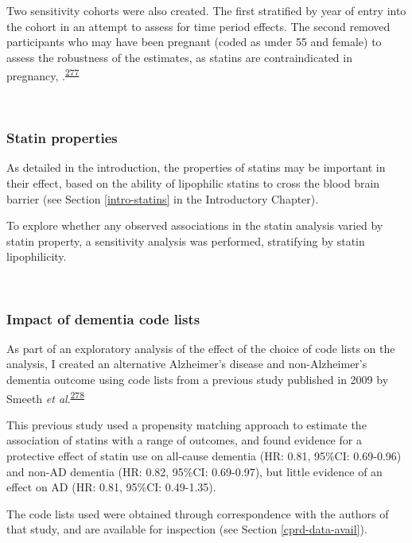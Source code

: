 \documentclass[a4paper, twoside]{templates/ociamthesis}
\begin{document}
Two sensitivity cohorts were also created. The first stratified by year of entry into the cohort in an attempt to assess for time period effects. The second removed participants who may have been pregnant (coded as under 55 and female) to assess the robustness of the estimates, as statins are contraindicated in pregnancy, .\textsuperscript{\protect\hyperlink{ref-karalis2016}{277}}

~

\hypertarget{statin-properties}{%
\subsubsection{Statin properties}\label{statin-properties}}

As detailed in the introduction, the properties of statins may be important in their effect, based on the ability of lipophilic statins to cross the blood brain barrier (see Section \ref{intro-statins} in the Introductory Chapter).

To explore whether any observed associations in the statin analysis varied by statin property, a sensitivity analysis was performed, stratifying by statin lipophilicity.

~

\hypertarget{impact-of-dementia-code-lists}{%
\subsubsection{Impact of dementia code lists}\label{impact-of-dementia-code-lists}}

As part of an exploratory analysis of the effect of the choice of code lists on the analysis, I created an alternative Alzheimer's disease and non-Alzheimer's dementia outcome using code lists from a previous study published in 2009 by Smeeth \emph{et al}.\textsuperscript{\protect\hyperlink{ref-smeeth2009}{278}}

This previous study used a propensity matching approach to estimate the association of statins with a range of outcomes, and found evidence for a protective effect of statin use on all-cause dementia (HR: 0.81, 95\%CI: 0.69-0.96) and non-AD dementia (HR: 0.82, 95\%CI: 0.69-0.97), but little evidence of an effect on AD (HR: 0.81, 95\%CI: 0.49-1.35).

The code lists used were obtained through correspondence with the authors of that study, and are available for inspection (see Section \ref{cprd-data-avail}).

~
\end{document}
